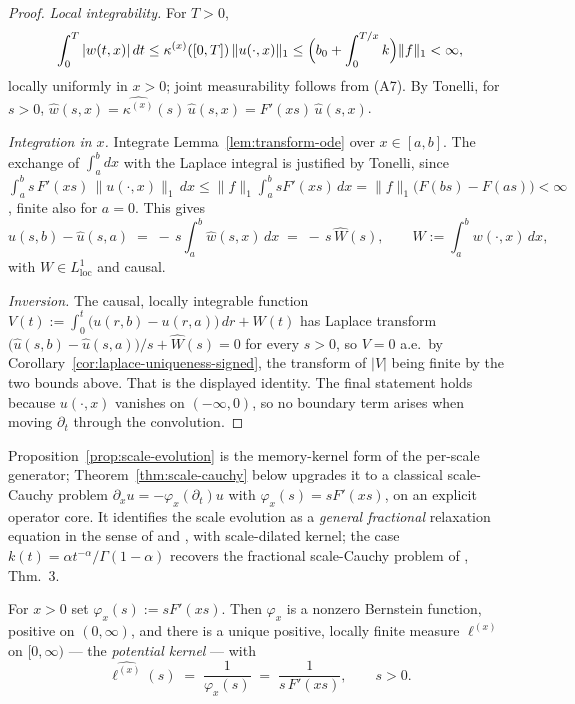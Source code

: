 \begin{proof}
\emph{Local integrability.} For $T > 0$,
\[
  \int_0^T |w(t,x)|\,dt \le \kappa^{(x)}([0,T])\,\|u(\cdot,x)\|_1
  \le \Bigl(b_0 + \int_0^{T/x} k\Bigr)\|f\|_1 < \infty,
\]
locally uniformly in $x > 0$; joint measurability follows from (A7). By Tonelli, for $s > 0$,
$\hat w(s, x) = \widehat{\kappa^{(x)}}(s)\,\hat u(s, x) = F'(xs)\,\hat u(s, x)$.

\emph{Integration in $x$.} Integrate Lemma~\ref{lem:transform-ode} over $x \in [a, b]$. The
exchange of $\int_a^b dx$ with the Laplace integral is justified by Tonelli, since
$\int_a^b s\,F'(xs)\,\|u(\cdot,x)\|_1\,dx \le \|f\|_1 \int_a^b s F'(xs)\,dx
= \|f\|_1\bigl(F(bs) - F(as)\bigr) < \infty$, finite also for $a = 0$. This gives
\[
  \hat u(s, b) - \hat u(s, a) \;=\; -\,s \int_a^b \hat w(s, x)\,dx \;=\; -\,s\,\widehat{W}(s),
  \qquad W := \int_a^b w(\cdot, x)\,dx,
\]
with $W \in L^1_{\mathrm{loc}}$ and causal.

\emph{Inversion.} The causal, locally integrable function
$V(t) := \int_0^t \bigl(u(r, b) - u(r, a)\bigr)\,dr + W(t)$ has Laplace transform
$\bigl(\hat u(s,b) - \hat u(s,a)\bigr)/s + \widehat W(s) = 0$ for every $s > 0$, so $V = 0$
a.e.\ by Corollary~\ref{cor:laplace-uniqueness-signed}, the transform of $|V|$ being finite
by the two bounds above. That is the displayed identity. The final
statement holds because $u(\cdot, x)$ vanishes on $(-\infty, 0)$, so no boundary term arises
when moving $\partial_t$ through the convolution.
\end{proof}

\begin{remark}\label{rem:general-fractional}
Proposition~\ref{prop:scale-evolution} is the memory-kernel form of the per-scale generator;
Theorem~\ref{thm:scale-cauchy} below upgrades it to a classical scale-Cauchy problem
$\partial_x u = -\varphi_x(\partial_t)u$ with $\varphi_x(s) = sF'(xs)$, on an explicit
operator core. It identifies the scale evolution as a \emph{general fractional} relaxation
equation in the sense of  and , with
scale-dilated kernel; the case $k(t) = \alpha t^{-\alpha}/\Gamma(1-\alpha)$ recovers the
fractional scale-Cauchy problem of , Thm.~3.
\end{remark}

\begin{lemma}\label{lem:potential-kernel}
For $x > 0$ set $\varphi_x(s) := s F'(xs)$. Then $\varphi_x$ is a nonzero Bernstein function,
positive on $(0,\infty)$, and there is a unique positive, locally finite measure $\ell^{(x)}$
on $[0,\infty)$ --- the \emph{potential kernel} --- with
\[
  \widehat{\ell^{(x)}}(s) \;=\; \frac{1}{\varphi_x(s)} \;=\; \frac{1}{s\,F'(xs)}, \qquad s > 0.
\]
\end{lemma}

